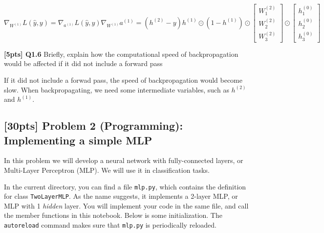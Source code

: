 \documentclass[11pt]{article}
\begin{document}
\[
\nabla_{W^{(1)}}L(\hat y, y) = \nabla_{a^{(1)}}L(\hat y, y) \nabla_{W^{(1)}}a^{(1)}
=
(h^{(2)} - y) h^{(1)} \odot (1-h^{(1)}) \odot
 \begin{bmatrix}
W^{(2)}_{1} \\
W^{(2)}_{2} \\
W^{(2)}_{3}
\end{bmatrix}
\odot
\begin{bmatrix}
h^{(0)}_{1} \\
h^{(0)}_{2} \\
h^{(0)}_{3}
\end{bmatrix}
\]

    \textbf{{[}5pts{]} Q1.6} Briefly, explain how the computational speed of
backpropagation would be affected if it did not include a forward pass

    If it did not include a forwad pass, the speed of backpropagation would
become slow. When backpropagating, we need some intermediate variables,
such as \(h^{(2)}\) and \(h^{(1)}\).

    \hypertarget{pts-problem-2-programming-implementing-a-simple-mlp}{%
\subsection{{[}30pts{]} Problem 2 (Programming): Implementing a simple
MLP}\label{pts-problem-2-programming-implementing-a-simple-mlp}}

In this problem we will develop a neural network with fully-connected
layers, or Multi-Layer Perceptron (MLP). We will use it in
classification tasks.

In the current directory, you can find a file \texttt{mlp.py}, which
contains the definition for class \texttt{TwoLayerMLP}. As the name
suggests, it implements a 2-layer MLP, or MLP with 1 \emph{hidden}
layer. You will implement your code in the same file, and call the
member functions in this notebook. Below is some initialization. The
\texttt{autoreload} command makes sure that \texttt{mlp.py} is
periodically reloaded.
\end{document}

